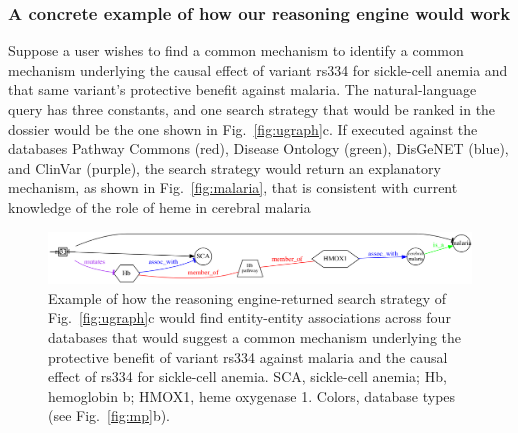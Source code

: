 \documentclass[11pt,notitlepage]{article}
\begin{document}
\subsubsection{A concrete example of how our reasoning engine would work}
Suppose a user wishes to find a common mechanism to identify a common
mechanism underlying the causal effect of variant rs334 for sickle-cell anemia
and that same variant's protective benefit against malaria. The natural-language
query has three constants, and one search strategy that would be ranked in the dossier
would be the one shown in Fig.~\ref{fig:ugraph}c. If executed against the databases
Pathway Commons (red), Disease Ontology (green), DisGeNET (blue), and ClinVar (purple),
the search strategy would return an explanatory mechanism, as shown in Fig.~\ref{fig:malaria},
that is consistent with current knowledge of the role of heme in cerebral malaria~\cite{Ferreira:2011ff}
\begin{figure}[h!]
     \includegraphics[width=6in]{net5.png} 
     \caption{Example of how the reasoning engine-returned search strategy of
       Fig.~\ref{fig:ugraph}c would find entity-entity associations across four
       databases that would suggest a common mechanism underlying the
       protective benefit of variant rs334 against malaria and the causal effect
       of rs334 for sickle-cell anemia. SCA, sickle-cell anemia; Hb,
       hemoglobin b; HMOX1, heme oxygenase 1.  Colors, database
       types (see Fig.~\ref{fig:mp}b).}
  \label{fig:networks}
\end{figure}
\end{document}
